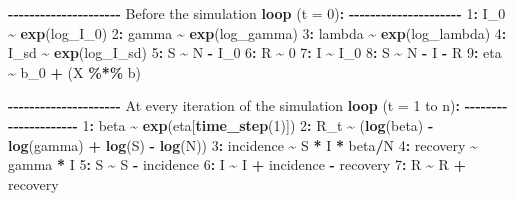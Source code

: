\documentclass[
11pt, %
oneside, %
english, %
singlespacing, %
]{macthesis} %
\newenvironment{Shaded}{\begin{snugshade}}{\end{snugshade}}
\newcommand{\AttributeTok}[1]{\textcolor[rgb]{0.13,0.29,0.53}{#1}}
\newcommand{\DecValTok}[1]{\textcolor[rgb]{0.00,0.00,0.81}{#1}}
\newcommand{\FunctionTok}[1]{\textcolor[rgb]{0.13,0.29,0.53}{\textbf{#1}}}
\newcommand{\NormalTok}[1]{#1}
\newcommand{\SpecialCharTok}[1]{\textcolor[rgb]{0.81,0.36,0.00}{\textbf{#1}}}
\begin{document}
\begin{Shaded}
\begin{Highlighting}[]
\SpecialCharTok{{-}{-}{-}{-}{-}{-}{-}{-}{-}{-}{-}{-}{-}{-}{-}{-}{-}{-}{-}{-}{-}}
\NormalTok{Before the simulation }\FunctionTok{loop}\NormalTok{ (}\AttributeTok{t =} \DecValTok{0}\NormalTok{)}\SpecialCharTok{:}
\SpecialCharTok{{-}{-}{-}{-}{-}{-}{-}{-}{-}{-}{-}{-}{-}{-}{-}{-}{-}{-}{-}{-}{-}}
\DecValTok{1}\SpecialCharTok{:}\NormalTok{ I\_0 }\SpecialCharTok{\textasciitilde{}} \FunctionTok{exp}\NormalTok{(log\_I\_0)}
\DecValTok{2}\SpecialCharTok{:}\NormalTok{ gamma }\SpecialCharTok{\textasciitilde{}} \FunctionTok{exp}\NormalTok{(log\_gamma)}
\DecValTok{3}\SpecialCharTok{:}\NormalTok{ lambda }\SpecialCharTok{\textasciitilde{}} \FunctionTok{exp}\NormalTok{(log\_lambda)}
\DecValTok{4}\SpecialCharTok{:}\NormalTok{ I\_sd }\SpecialCharTok{\textasciitilde{}} \FunctionTok{exp}\NormalTok{(log\_I\_sd)}
\DecValTok{5}\SpecialCharTok{:}\NormalTok{ S }\SpecialCharTok{\textasciitilde{}}\NormalTok{ N }\SpecialCharTok{{-}}\NormalTok{ I\_0}
\DecValTok{6}\SpecialCharTok{:}\NormalTok{ R }\SpecialCharTok{\textasciitilde{}} \DecValTok{0}
\DecValTok{7}\SpecialCharTok{:}\NormalTok{ I }\SpecialCharTok{\textasciitilde{}}\NormalTok{ I\_0}
\DecValTok{8}\SpecialCharTok{:}\NormalTok{ S }\SpecialCharTok{\textasciitilde{}}\NormalTok{ N }\SpecialCharTok{{-}}\NormalTok{ I }\SpecialCharTok{{-}}\NormalTok{ R}
\DecValTok{9}\SpecialCharTok{:}\NormalTok{ eta }\SpecialCharTok{\textasciitilde{}}\NormalTok{ b\_0 }\SpecialCharTok{+}\NormalTok{ (X }\SpecialCharTok{\%*\%}\NormalTok{ b)}

\SpecialCharTok{{-}{-}{-}{-}{-}{-}{-}{-}{-}{-}{-}{-}{-}{-}{-}{-}{-}{-}{-}{-}{-}}
\NormalTok{At every iteration of the simulation }\FunctionTok{loop}\NormalTok{ (}\AttributeTok{t =} \DecValTok{1}\NormalTok{ to n)}\SpecialCharTok{:}
\SpecialCharTok{{-}{-}{-}{-}{-}{-}{-}{-}{-}{-}{-}{-}{-}{-}{-}{-}{-}{-}{-}{-}{-}}
\DecValTok{1}\SpecialCharTok{:}\NormalTok{ beta }\SpecialCharTok{\textasciitilde{}} \FunctionTok{exp}\NormalTok{(eta[}\FunctionTok{time\_step}\NormalTok{(}\DecValTok{1}\NormalTok{)]) }
\DecValTok{2}\SpecialCharTok{:}\NormalTok{ R\_t }\SpecialCharTok{\textasciitilde{}}\NormalTok{ (}\FunctionTok{log}\NormalTok{(beta) }\SpecialCharTok{{-}} \FunctionTok{log}\NormalTok{(gamma) }\SpecialCharTok{+} \FunctionTok{log}\NormalTok{(S) }\SpecialCharTok{{-}} \FunctionTok{log}\NormalTok{(N))}
\DecValTok{3}\SpecialCharTok{:}\NormalTok{ incidence }\SpecialCharTok{\textasciitilde{}}\NormalTok{ S }\SpecialCharTok{*}\NormalTok{ I }\SpecialCharTok{*}\NormalTok{ beta}\SpecialCharTok{/}\NormalTok{N}
\DecValTok{4}\SpecialCharTok{:}\NormalTok{ recovery }\SpecialCharTok{\textasciitilde{}}\NormalTok{ gamma }\SpecialCharTok{*}\NormalTok{ I}
\DecValTok{5}\SpecialCharTok{:}\NormalTok{ S }\SpecialCharTok{\textasciitilde{}}\NormalTok{ S }\SpecialCharTok{{-}}\NormalTok{ incidence}
\DecValTok{6}\SpecialCharTok{:}\NormalTok{ I }\SpecialCharTok{\textasciitilde{}}\NormalTok{ I }\SpecialCharTok{+}\NormalTok{ incidence }\SpecialCharTok{{-}}\NormalTok{ recovery}
\DecValTok{7}\SpecialCharTok{:}\NormalTok{ R }\SpecialCharTok{\textasciitilde{}}\NormalTok{ R }\SpecialCharTok{+}\NormalTok{ recovery}


\end{Highlighting}
\end{Shaded}
\end{document}
